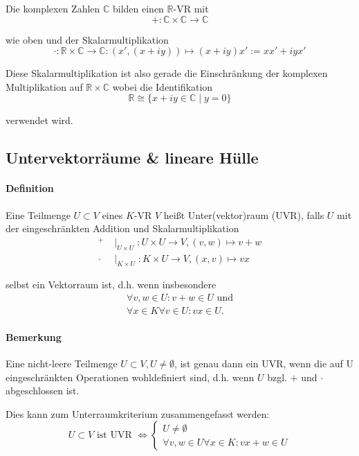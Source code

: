 	Die komplexen Zahlen $\mathbb{C}$ bilden einen $\mathbb{R}$-VR mit
	\begin{equation*}
		+:\mathbb{C}\times\mathbb{C}\to\mathbb{C}
	\end{equation*}

	wie oben und der Skalarmultiplikation
	\begin{equation*}
		\cdot:\mathbb{R}\times\mathbb{C}\to\mathbb{C}:(x',(x+iy))\mapsto(x+iy)x':=xx'+iyx'
	\end{equation*}

	Diese Skalarmultiplikation ist also gerade die Einschränkung der komplexen Multiplikation auf $\mathbb{R}\times\mathbb{C}$ wobei die Identifikation
	\begin{equation*}
		\mathbb{R}\cong \{{x+iy\in\mathbb{C}\mid y=0}\}
	\end{equation*}

	verwendet wird.
\subsection{Untervektorräume \& lineare Hülle}
\paragraph{Definition}
	Eine Teilmenge $U\subset V$ eines $K$-VR $V$ heißt Unter(vektor)raum (UVR), falls $U$ mit der eingeschränkten Addition und Skalarmultiplikation
	\begin{align*}
		 ^+    & \mid_{U\times U}: U\times U \to V,(v,w) \mapsto v+w \\
		 \cdot & \mid_{K\times U}: K\times U \to V,(x,v) \mapsto vx
	\end{align*}

	selbst ein Vektorraum ist, d.h. wenn insbesondere
	\begin{gather*}
		\forall v,w \in U: v+w\in U \text{ und}\\
		\forall x\in K\forall v\in U: vx\in U.
	\end{gather*}

\paragraph{Bemerkung}
	Eine nicht-leere Teilmenge $U\subset V, U\neq\emptyset$, ist genau dann ein UVR, wenn die auf U eingeschränkten Operationen wohldefiniert sind, d.h. wenn $ U $ bzgl. $ + $ und $ \cdot $ abgeschlossen ist.

	Dies kann zum Unterraumkriterium zusammengefasst werden:
	\begin{equation*}
		U\subset V \text{ ist UVR }\Leftrightarrow 
 		 \begin{cases}
 		 	U\neq\emptyset\\
 		 	\forall v,w\in U\forall x\in K: vx+w\in U
 		 \end{cases}
	\end{equation*}

